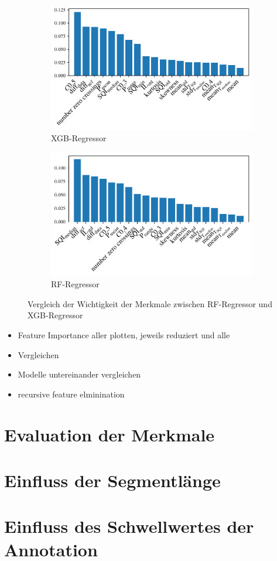  \begin{figure}[h]
 	\centering
		\begin{subfigure}{.495\textwidth}
			\centering
 			\includegraphics[width=\textwidth]{pic/xgb-regr-reduced-importances.pdf}
 			\caption{\ac{XGB}-Regressor}
 		\end{subfigure}
    	\begin{subfigure}{.495\textwidth}
    		\centering
 			\includegraphics[width=\textwidth]{pic/rf-regr-reduced-importances.pdf}
 			\caption{\ac{RF}-Regressor}
 		\end{subfigure}
 	\caption{Vergleich der Wichtigkeit der Merkmale zwischen \ac{RF}-Regressor und \ac{XGB}-Regressor}
 	\label{fig:importances-comparison-rf-xgb-regr}
 \end{figure}

	
	\begin{itemize}
		\item Feature Importance aller plotten, jeweils reduziert und alle
		\item Vergleichen
		\item Modelle untereinander vergleichen
		\item recursive feature elminination
	\end{itemize}
	
	\section{Evaluation der Merkmale}

	\section{Einfluss der Segmentlänge}

	\section{Einfluss des Schwellwertes der Annotation}
